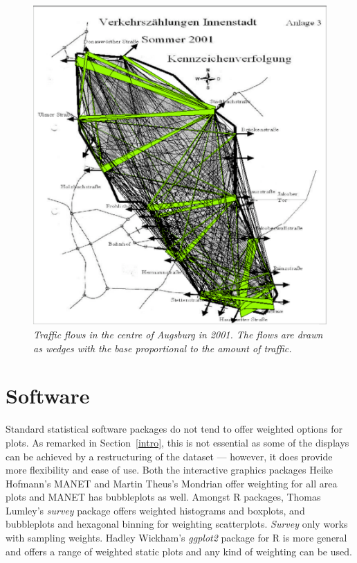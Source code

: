 \documentclass{svmult}
\begin{document}
\begin{figure}[htbp]
  \centering
  \includegraphics[width=0.8\linewidth]{TraffFlow}
  \caption{\label{traffic}\em Traffic flows in the centre of Augsburg in 2001. The flows are drawn as wedges with the base proportional to the amount of traffic. }
\end{figure}

\section{Software}
\label{sw}

Standard statistical software packages do not tend to offer weighted options for plots.  As remarked in Section~\ref{intro}, this is not essential as some of the displays can be achieved by a restructuring of the dataset --- however, it does provide more flexibility and ease of use.  Both the interactive graphics packages Heike Hofmann's MANET \citep{hofmann:2000a} and Martin Theus's Mondrian \citep{theus:2005} offer weighting for all area plots and MANET has bubbleplots as well.  Amongst R packages, Thomas Lumley's \textit{survey} \cite{survey} package offers weighted histograms and boxplots, and bubbleplots and hexagonal binning for weighting scatterplots.  \textit{Survey} only works with sampling weights.  Hadley Wickham's \textit{ggplot2} \cite{ggplot2} package for R is more general and offers a range of weighted static plots and any kind of weighting can be used.
\end{document}
